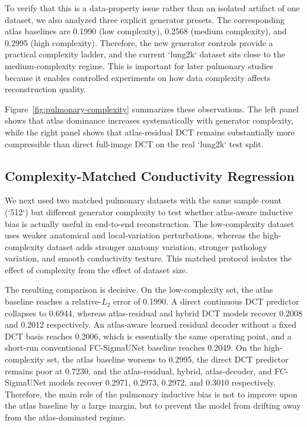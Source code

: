 \documentclass[11pt,a4paper]{article}
\begin{document}
To verify that this is a data-property issue rather than an isolated artifact of one dataset, we also analyzed three explicit generator presets. The corresponding atlas baselines are 0.1990 (low complexity), 0.2568 (medium complexity), and 0.2995 (high complexity). Therefore, the new generator controls provide a practical complexity ladder, and the current `lung2k` dataset sits close to the medium-complexity regime. This is important for later pulmonary studies because it enables controlled experiments on how data complexity affects reconstruction quality.

Figure~\ref{fig:pulmonary-complexity} summarizes these observations. The left panel shows that atlas dominance increases systematically with generator complexity, while the right panel shows that atlas-residual DCT remains substantially more compressible than direct full-image DCT on the real `lung2k` test split.

\subsection{Complexity-Matched Conductivity Regression}
We next used two matched pulmonary datasets with the same sample count (`512`) but different generator complexity to test whether atlas-aware inductive bias is actually useful in end-to-end reconstruction. The low-complexity dataset uses weaker anatomical and local-variation perturbations, whereas the high-complexity dataset adds stronger anatomy variation, stronger pathology variation, and smooth conductivity texture. This matched protocol isolates the effect of complexity from the effect of dataset size.

The resulting comparison is decisive. On the low-complexity set, the atlas baseline reaches a relative-$L_2$ error of 0.1990. A direct continuous DCT predictor collapses to 0.6944, whereas atlas-residual and hybrid DCT models recover 0.2008 and 0.2012 respectively. An atlas-aware learned residual decoder without a fixed DCT basis reaches 0.2006, which is essentially the same operating point, and a short-run conventional FC-SigmaUNet baseline reaches 0.2049. On the high-complexity set, the atlas baseline worsens to 0.2995, the direct DCT predictor remains poor at 0.7230, and the atlas-residual, hybrid, atlas-decoder, and FC-SigmaUNet models recover 0.2971, 0.2973, 0.2972, and 0.3010 respectively. Therefore, the main role of the pulmonary inductive bias is not to improve upon the atlas baseline by a large margin, but to prevent the model from drifting away from the atlas-dominated regime.
\end{document}
